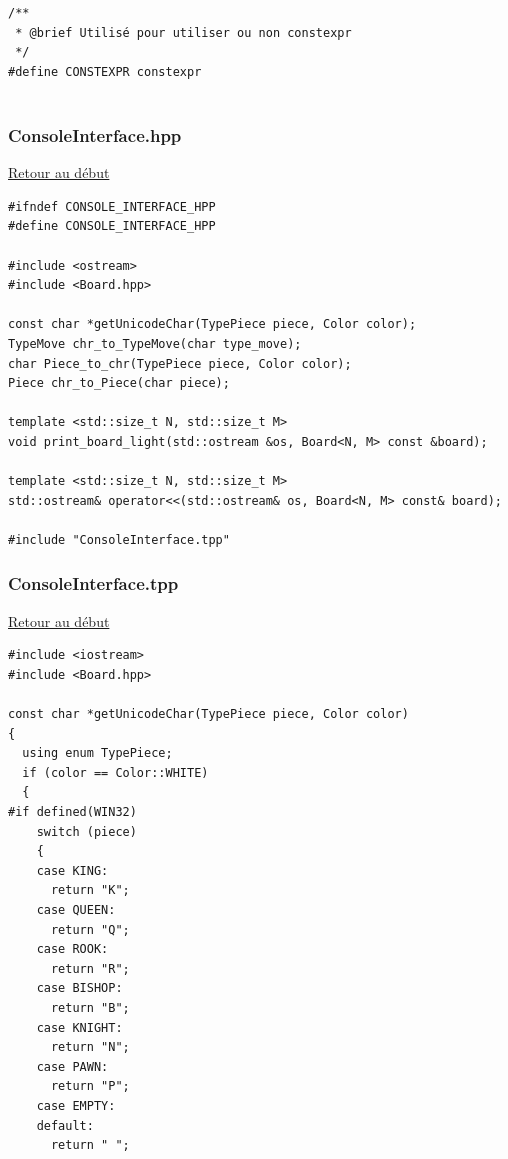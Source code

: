 {\begin{frame}[fragile]
\begin{verbatim}
/**
 * @brief Utilisé pour utiliser ou non constexpr
 */
#define CONSTEXPR constexpr


\end{verbatim}
\end{frame}

\begin{frame}[fragile]
\label{ConsoleInterface.hpp}
\frametitle{ConsoleInterface.hpp}
\hyperlink{conclusion}{Retour au début}\newline
\begin{verbatim}
#ifndef CONSOLE_INTERFACE_HPP
#define CONSOLE_INTERFACE_HPP

#include <ostream>
#include <Board.hpp>

const char *getUnicodeChar(TypePiece piece, Color color);
TypeMove chr_to_TypeMove(char type_move);
char Piece_to_chr(TypePiece piece, Color color);
Piece chr_to_Piece(char piece);

template <std::size_t N, std::size_t M>
void print_board_light(std::ostream &os, Board<N, M> const &board);

template <std::size_t N, std::size_t M>
std::ostream& operator<<(std::ostream& os, Board<N, M> const& board);

#include "ConsoleInterface.tpp"

\end{verbatim}
\end{frame}

\begin{frame}[fragile]
\label{ConsoleInterface.tpp}
\frametitle{ConsoleInterface.tpp}
\hyperlink{conclusion}{Retour au début}\newline
\begin{verbatim}
#include <iostream>
#include <Board.hpp>

const char *getUnicodeChar(TypePiece piece, Color color)
{
  using enum TypePiece;
  if (color == Color::WHITE)
  {
#if defined(WIN32)
    switch (piece)
    {
    case KING:
      return "K";
    case QUEEN:
      return "Q";
    case ROOK:
      return "R";
    case BISHOP:
      return "B";
    case KNIGHT:
      return "N";
    case PAWN:
      return "P";
    case EMPTY:
    default:
      return " ";
\end{verbatim}
\end{frame}

}
